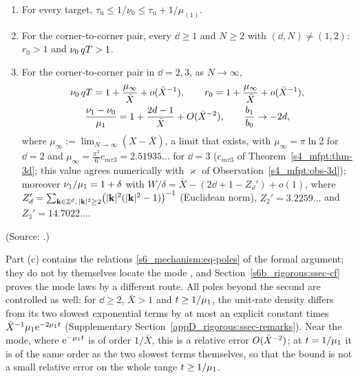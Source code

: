\begin{theorem}\label{s6b_rigorous:thm-poles}
\begin{enumerate}
\item[(a)] For every target, $\tau_{\mathrm u}\le1/\nu_0\le\tau_{\mathrm u}+1/\mu_{(1)}$.
\item[(b)] For the corner-to-corner pair, every $\dd\ge1$ and $N\ge2$ with $(\dd,N)\ne(1,2)$: $r_0>1$ and
$\nu_0\,qT>1$.
\item[(c)] For the corner-to-corner pair in $\dd=2,3$, as $N\to\infty$,
\begin{gather*}
\nu_0\,qT=1+\frac{\mu_\infty}{\bar X}+o(\bar X^{-1}),\qquad
r_0=1+\frac{\mu_\infty}{\bar X}+o(\bar X^{-1}),\\
\frac{\nu_1-\nu_0}{\mu_{1}}=1+\frac{2d-1}{\bar X}+O(\bar X^{-2}),\qquad \frac{b_1}{b_0}\to-2d ,
\end{gather*}
where $\mu_\infty:=\lim_{N\to\infty}(X-\bar X)$, a limit that exists, with $\mu_\infty=\pi\ln2$ for $\dd=2$ and
$\mu_\infty=\frac{\pi^{2}}{6}c_{m\tau3}=2.51935\ldots$ for $\dd=3$ ($c_{m\tau3}$ of Theorem~\ref{s4_mfpt:thm-3d}; this
value agrees numerically with $\varkappa$ of Observation~\ref{s4_mfpt:obs-3d}); moreover $\nu_1/\mu_{1}=1+\delta$ with
$W/\delta=\bar X-(2\dd+1-Z_\dd')+o(1)$, where $Z_d'=\sum_{\mathbf{k}\in\mathbb Z^{d},\,|\mathbf{k}|^{2}\ge2}\bigl(|\mathbf{k}|^{2}(|\mathbf{k}|^{2}-1)\bigr)^{-1}$
(Euclidean norm), $Z_2'=3.2259\ldots$ and $Z_3'=14.7022\ldots$.
\end{enumerate}
\textup{(Source: .)}
\end{theorem}

Part (c) contains the relations \eqref{s6_mechanism:eq-poles} of the formal argument; they do not by themselves locate
the mode , and Section~\ref{s6b_rigorous:ssec-cf} proves the mode laws by a different
route. All poles beyond the second are controlled as well: for $\dd\ge2$, $\bar X>1$ and $t\ge1/\mu_{1}$, the unit-rate
density differs from its two slowest exponential terms by at most an explicit constant times $\bar X^{-1}\mu_{1}\mathrm{e}^{-2\mu_{1} t}$
 (Supplementary Section~\ref{appD_rigorous:ssec-remarks}). Near the mode, where
$\mathrm{e}^{-\mu_{1} t}$ is of order $1/\bar X$, this is a relative error $O(\bar X^{-2})$; at $t=1/\mu_{1}$ it is of the
same order as the two slowest terms themselves, so that the bound is not a small relative error on the whole range
$t\ge1/\mu_{1}$.

